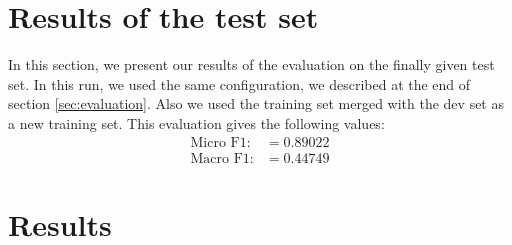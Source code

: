 \documentclass[noindent, nochapname]{tudexercise}
\begin{document}
	\section{Results of the test set}
		In this section, we present our results of the evaluation on the finally given test set. In this run, we used the same configuration, we described at the end of section \ref{sec:evaluation}. Also we used the training set merged with the dev set as a new training set. This evaluation gives the following values:
		\begin{align}
\text{Micro F1:} &= 0.89022\\
\text{Macro F1:} &= 0.44749
		\end{align}
	
	\newpage
	\appendix
		\section{Results}\label{app:results}\centering
			
\end{document}

